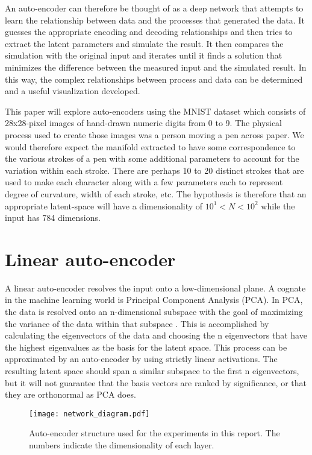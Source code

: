 \documentclass{article}
\begin{document}
An auto-encoder can therefore be thought of as a deep network that attempts to learn the relationship between data and the processes that generated the data. It guesses the appropriate encoding and decoding relationships and then tries to extract the latent parameters and simulate the result. It then compares the simulation with the original input and iterates until it finds a solution that minimizes the difference between the measured input and the simulated result. In this way, the complex relationships between process and data can be determined and a useful visualization developed.

This paper will explore auto-encoders using the MNIST dataset which consists of 28x28-pixel images of hand-drawn numeric digits from 0 to 9. The physical process used to create those images was a person moving a pen across paper. We would therefore expect the manifold extracted to have some correspondence to the various strokes of a pen with some additional parameters to account for the variation within each stroke. There are perhaps 10 to 20 distinct strokes that are used to make each character along with a few parameters each to represent degree of curvature, width of each stroke, etc. The hypothesis is therefore that an appropriate latent-space will have a dimensionality of $10^1 < N < 10^2$ while the input has 784 dimensions.

\section{Linear auto-encoder}
A linear auto-encoder resolves the input onto a low-dimensional plane. A cognate in the machine learning world is Principal Component Analysis (PCA). In PCA, the data is resolved onto an n-dimensional subspace with the goal of maximizing the variance of the data within that subspace \cite{hoover}. This is accomplished by calculating the eigenvectors of the data and choosing the n eigenvectors that have the highest eigenvalues as the basis for the latent space. This process can be approximated by an auto-encoder by using strictly linear activations. The resulting latent space should span a similar subspace to the first n eigenvectors, but it will not guarantee that the basis vectors are ranked by significance, or that they are orthonormal as PCA does.

\begin{figure}[h]
\begin{center}
\texttt{[image: network\_diagram.pdf]} 
\caption{Auto-encoder structure used for the experiments in this report. The numbers indicate the dimensionality of each layer.}
\label{fig:network_diagram}
\end{center}
\end{figure}
\end{document}
